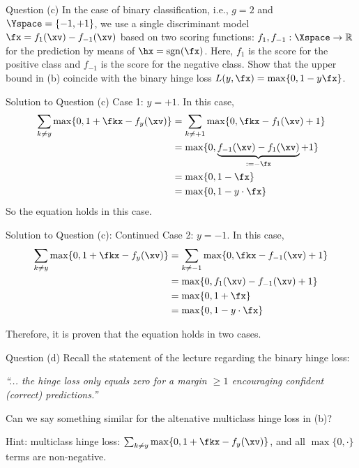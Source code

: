 \documentclass[aspectratio=169]{beamer}
\newcommand{\fyx}{f_y(\xv)}
\begin{document}
\begin{frame}{Question (c)}
	In the case of binary classification, i.e., $g=2$ and $\Yspace = \{-1, +1\}$, we use a single discriminant model $\fx = f_1(\xv) - f_{-1}(\xv)$ based on two scoring functions: $f_1, f_{-1}: \Xspace \to \mathbb{R}$ for the prediction by means of $\hx = \mathrm{sgn}(\fx)$. Here, $f_1$ is the score for the positive class and $f_{-1}$ is the score for the negative class. Show that the upper bound in (b) coincide with the binary hinge loss $L(y, \fx) = \max \{0, 1 - y \fx \}$.
\end{frame}

\begin{frame}{Solution to Question (c)}
	Case 1: $y= + 1$. In this case,
	\begin{align*}
		\sum_{k \neq y} \max \{0, 1 + \fkx - \fyx\}
		&= \sum_{k \neq + 1} \max \{ 0, \fkx - f_1(\xv) + 1 \} \\
		&= \max \{ 0, \underbrace{f_{-1}(\xv) - f_1(\xv)}_{:= - \fx} + 1 \} \\
		&= \max \{ 0, 1 - \fx \} \\
		&= \max \{ 0, 1 - y \cdot \fx \}
	\end{align*}
	So the equation holds in this case.
\end{frame}

\begin{frame}{Solution to Question (c): Continued}
	Case 2: $y = -1$. In this case,
	\begin{align*}
		\sum_{k \neq y} \max \{0, 1 + \fkx - \fyx \}
		&= \sum_{k \neq -1} \max \{ 0, \fkx - f_{-1}(\xv) + 1 \} \\
		&= \max \{ 0, f_1(\xv) - f_{-1}(\xv) + 1 \} \\
		&= \max \{0, 1 + \fx \} \\
		&= \max \{0, 1 - y\cdot \fx \}
	\end{align*}
	
Therefore, it is proven that the equation holds in two cases.
\end{frame}

\begin{frame}{Question (d)}
	Recall the statement of the lecture regarding the binary hinge loss:
	\vspace{10pt}
	
	\emph{``... the hinge loss only equals zero for a margin $\geq 1$ encouraging confident (correct) predictions.''}
	\vspace{10pt}
	
	Can we say something similar for the altenative multiclass hinge loss in (b)?
	
	Hint: multiclass hinge loss: $\sum_{k\neq y} \max \{0, 1 + \fkx - f_y(\xv) \}$, and all $\max\{0, \cdot\}$ terms are non-negative.
\end{frame}
\end{document}
